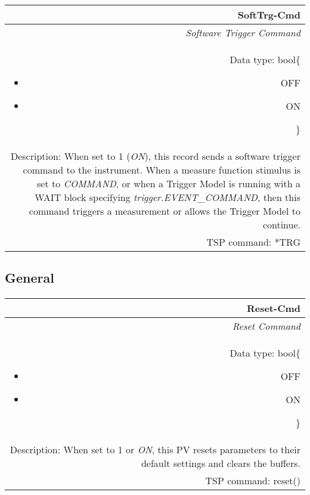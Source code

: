 \documentclass[openany]{article}
\begin{document}
		\begin{tabular}{N}
			\hline
			\bfseries SoftTrg-Cmd\label{pv:tmblocklist-mon} \\ \hline
			\emph{Software Trigger Command} \\
			Data type: bool\{\begin{itemize}[noitemsep]
				\small
				\item[] OFF
				\item[] ON
			\end{itemize}\} \\
			Description: When set to 1 (\emph{ON}), this record sends a software trigger command to the instrument. When a measure function stimulus is set to \emph{COMMAND}, or when a Trigger Model is running with a WAIT block specifying \emph{trigger.EVENT\_COMMAND}, then this command triggers a measurement or allows the Trigger Model to continue. \\
			TSP command: *TRG
		\end{tabular}

	\subsection{General}\label{pvgroup:general}

		\paragraph{} %

		\begin{tabular}{N}
			\hline
			\bfseries Reset-Cmd\label{pv:reset-cmd} \\ \hline
			\emph{Reset Command} \\
			Data type: bool\{\begin{itemize}[noitemsep]
				\small
				\item[] OFF
				\item[] ON
			\end{itemize}\} \\
			Description: When set to 1 or \emph{ON}, this PV resets parameters to their default settings and clears the buffers. \\
			TSP command: reset()
		\end{tabular}
\end{document}
